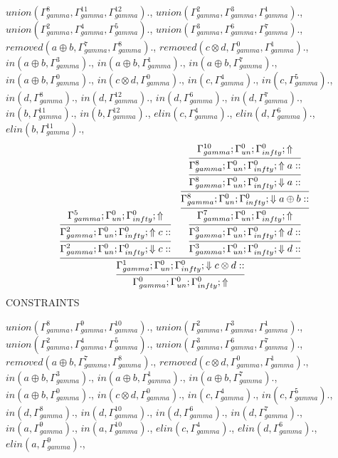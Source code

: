 \documentclass[a4paper, 11pt]{article}
\begin{document}
$union(\Gamma_{gamma}^{8}, \Gamma_{gamma}^{11}, \Gamma_{gamma}^{12}).$, $union(\Gamma_{gamma}^{2}, \Gamma_{gamma}^{3}, \Gamma_{gamma}^{1}).$, $union(\Gamma_{gamma}^{2}, \Gamma_{gamma}^{4}, \Gamma_{gamma}^{5}).$, $union(\Gamma_{gamma}^{3}, \Gamma_{gamma}^{6}, \Gamma_{gamma}^{7}).$, $removed(a \oplus b, \Gamma_{gamma}^{7}, \Gamma_{gamma}^{8}).$, $removed(c \otimes d, \Gamma_{gamma}^{0}, \Gamma_{gamma}^{1}).$, $in(a \oplus b, \Gamma_{gamma}^{3}).$, $in(a \oplus b, \Gamma_{gamma}^{1}).$, $in(a \oplus b, \Gamma_{gamma}^{7}).$, $in(a \oplus b, \Gamma_{gamma}^{0}).$, $in(c \otimes d, \Gamma_{gamma}^{0}).$, $in(c, \Gamma_{gamma}^{4}).$, $in(c, \Gamma_{gamma}^{5}).$, $in(d, \Gamma_{gamma}^{8}).$, $in(d, \Gamma_{gamma}^{12}).$, $in(d, \Gamma_{gamma}^{6}).$, $in(d, \Gamma_{gamma}^{7}).$, $in(b, \Gamma_{gamma}^{11}).$, $in(b, \Gamma_{gamma}^{12}).$, $elin(c, \Gamma_{gamma}^{4}).$, $elin(d, \Gamma_{gamma}^{6}).$, $elin(b, \Gamma_{gamma}^{11}).$, 
\[
\infer{\Gamma_{ gamma}^{0} ; \Gamma_{un}^{0} ; \Gamma_{ infty}^{0} ;  \Uparrow }
{\infer{\Gamma_{ gamma}^{1} ; \Gamma_{un}^{0} ; \Gamma_{ infty}^{0} ;  \Downarrow c \otimes d :: }
{\infer{\Gamma_{ gamma}^{2} ; \Gamma_{un}^{0} ; \Gamma_{ infty}^{0} ;  \Downarrow c :: }
{\infer{\Gamma_{ gamma}^{2} ; \Gamma_{un}^{0} ; \Gamma_{ infty}^{0} ;  \Uparrow c :: }
{\Gamma_{ gamma}^{5} ; \Gamma_{un}^{0} ; \Gamma_{ infty}^{0} ;  \Uparrow }}
&
\infer{\Gamma_{ gamma}^{3} ; \Gamma_{un}^{0} ; \Gamma_{ infty}^{0} ;  \Downarrow d :: }
{\infer{\Gamma_{ gamma}^{3} ; \Gamma_{un}^{0} ; \Gamma_{ infty}^{0} ;  \Uparrow d :: }
{\infer{\Gamma_{ gamma}^{7} ; \Gamma_{un}^{0} ; \Gamma_{ infty}^{0} ;  \Uparrow }
{\infer{\Gamma_{ gamma}^{8} ; \Gamma_{un}^{0} ; \Gamma_{ infty}^{0} ;  \Downarrow a \oplus b :: }
{\infer{\Gamma_{ gamma}^{8} ; \Gamma_{un}^{0} ; \Gamma_{ infty}^{0} ;  \Downarrow a :: }
{\infer{\Gamma_{ gamma}^{8} ; \Gamma_{un}^{0} ; \Gamma_{ infty}^{0} ;  \Uparrow a :: }
{\Gamma_{ gamma}^{10} ; \Gamma_{un}^{0} ; \Gamma_{ infty}^{0} ;  \Uparrow }}}}}}}}
\]
CONSTRAINTS

$union(\Gamma_{gamma}^{8}, \Gamma_{gamma}^{9}, \Gamma_{gamma}^{10}).$, $union(\Gamma_{gamma}^{2}, \Gamma_{gamma}^{3}, \Gamma_{gamma}^{1}).$, $union(\Gamma_{gamma}^{2}, \Gamma_{gamma}^{4}, \Gamma_{gamma}^{5}).$, $union(\Gamma_{gamma}^{3}, \Gamma_{gamma}^{6}, \Gamma_{gamma}^{7}).$, $removed(a \oplus b, \Gamma_{gamma}^{7}, \Gamma_{gamma}^{8}).$, $removed(c \otimes d, \Gamma_{gamma}^{0}, \Gamma_{gamma}^{1}).$, $in(a \oplus b, \Gamma_{gamma}^{3}).$, $in(a \oplus b, \Gamma_{gamma}^{1}).$, $in(a \oplus b, \Gamma_{gamma}^{7}).$, $in(a \oplus b, \Gamma_{gamma}^{0}).$, $in(c \otimes d, \Gamma_{gamma}^{0}).$, $in(c, \Gamma_{gamma}^{4}).$, $in(c, \Gamma_{gamma}^{5}).$, $in(d, \Gamma_{gamma}^{8}).$, $in(d, \Gamma_{gamma}^{10}).$, $in(d, \Gamma_{gamma}^{6}).$, $in(d, \Gamma_{gamma}^{7}).$, $in(a, \Gamma_{gamma}^{9}).$, $in(a, \Gamma_{gamma}^{10}).$, $elin(c, \Gamma_{gamma}^{4}).$, $elin(d, \Gamma_{gamma}^{6}).$, $elin(a, \Gamma_{gamma}^{9}).$, 
\end{document}
